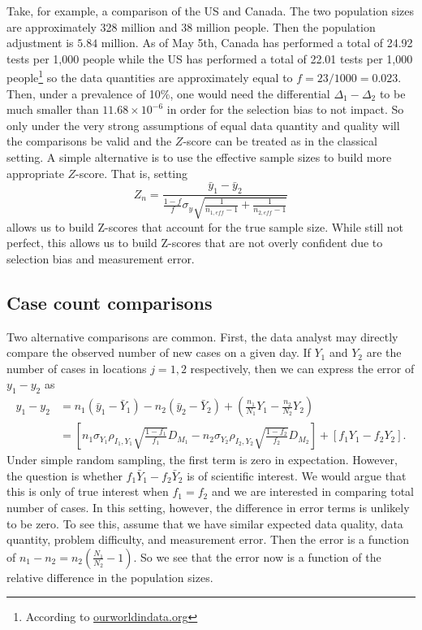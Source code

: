 \documentclass[aoas]{amsart}
\begin{document}
Take, for example, a comparison of the US and Canada.  The two population sizes are approximately 328 million and 38 million people.  Then the population adjustment is $5.84$ million. As of May 5th, Canada has performed a total of 24.92 tests per 1,000 people while the US has performed a total of 22.01 tests per 1,000 people\footnote{According to \href{https://ourworldindata.org/grapher/full-list-cumulative-total-tests-per-thousand}{ourworldindata.org}} so the data quantities are approximately equal to $f = 23/1000 = 0.023$.  Then, under a prevalence of 10\%, one would need the differential $\Delta_1-\Delta_2$ to be much smaller than $11.68 \times 10^{-6}$ in order for the selection bias to not impact.  So only under the very strong assumptions of equal data quantity and quality will the comparisons be valid and the $Z$-score can be treated as in the classical setting.  A simple alternative is to use the effective sample sizes to build more appropriate $Z$-score.  That is, setting
$$
Z_n = \frac{\bar y_1 - \bar y_2}{ \frac{1-f}{f} \sigma_y \sqrt{ \frac{1}{n_{1,eff} - 1} + \frac{1}{n_{2,eff} - 1}}}
$$
allows us to build Z-scores that account for the true sample size.  While still not perfect, this allows us to build Z-scores that are not overly confident due to selection bias and measurement error.

\subsection{Case count comparisons}
Two alternative comparisons are common. First, the data analyst may directly compare the observed number of new cases on a given day.  If $Y_1$ and $Y_2$ are the number of cases in locations $j=1,2$ respectively, then we can express the error of $y_1 - y_2$ as
$$
\begin{aligned}
y_1 - y_2 &= n_1 ( \bar y_1 - \bar Y_{1}) - n_2 ( \bar y_2 - \bar Y_{2}) + \left( \frac{n_1}{N_1} Y_{1} - \frac{n_2}{N_2} Y_2  \right) \\
&= \left[ n_1 \sigma_{Y_1} \rho_{I_1, Y_1} \sqrt{\frac{1-f_1}{f_1}} D_{M_1} - n_2 \sigma_{Y_2} \rho_{I_2, Y_2} \sqrt{\frac{1-f_2}{f_2}} D_{M_2}  \right] + \left[ f_1 Y_1 - f_2 Y_2 \right].
\end{aligned}
$$
Under simple random sampling, the first term is zero in expectation.  However, the question is whether $f_1 \bar Y_1 - f_2 \bar Y_2$ is of scientific interest.  We would argue that this is only of true interest when $f_1 = f_2$ and we are interested in comparing total number of cases.  In this setting, however, the difference in error terms is unlikely to be zero.  To see this, assume that we have similar expected data quality, data quantity, problem difficulty, and measurement error.  Then the error is a function of $n_1 - n_2 = n_2 \left( \frac{N_1}{N_2} - 1 \right)$.  So we see that the error now is a function of the relative difference in the population sizes.
\end{document}
